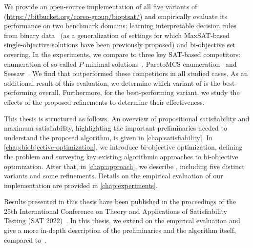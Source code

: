 We provide an open-source implementation of all five variants of \algname{} ({\small\url{https://bitbucket.org/coreo-group/bioptsat/}}) and empirically evaluate its performance on two benchmark domains:
learning interpretable decision rules from binary data~\autocite{DBLP:conf/cp/MaliotovM18} (as a generalization of settings for which MaxSAT-based single-objective solutions have been previously proposed) and bi-objective set covering.
In the experiments, we compare \algname{} to three key SAT-based competitors:
enumeration of so-called $P$-minimal solutions~\autocite{DBLP:conf/cp/SohBTB17}, ParetoMCS enumeration~\autocite{DBLP:conf/ijcai/Terra-NevesLM18a} and Seesaw~\autocite{DBLP:conf/cp/JanotaMSM21}.
We find that \algname{} outperformed these competitors in all studied cases.
As an additional result of this evaluation, we determine which variant of \algname{} is the best-performing overall.
Furthermore, for the best-performing variant, we study the effects of the proposed refinements to determine their effectiveness.

This thesis is structured as follows.
An overview of propositional satisfiability and maximum satisfiability, highlighting the important preliminaries needed to understand the proposed algorithm, is given in \cref{chap:satisfiability}.
In \cref{chap:biobjective-optimization}, we introduce bi-objective optimization, defining the problem and surveying key existing algorithmic approaches to bi-objective optimization.
After that, in \cref{chap:approach}, we describe \algname{}, including five distinct variants and some refinements.
Details on the empirical evaluation of our implementation are provided in \cref{chap:experiments}.

Results presented in this thesis have been published in the proceedings of the 25th International Conference on Theory and Applications of Satisfiability Testing (SAT 2022)~\autocite{JabsEtAl2022MaxSATBasedBi}.
In this thesis, we extend on the empirical evaluation and give a more in-depth description of the preliminaries and the algorithm itself, compared to~\autocite{JabsEtAl2022MaxSATBasedBi}.